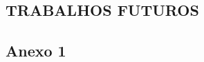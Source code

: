 \documentclass[12pt,oneside,a4paper, chapter=TITLE, section = TITLE, english, brazil]{abntex2}
\begin{document}
\section{TRABALHOS FUTUROS}

\postextual



%
%


\begin{anexosenv}

\partanexos %

\chapter{Anexo 1}

\end{anexosenv}

\printindex
\end{document}
